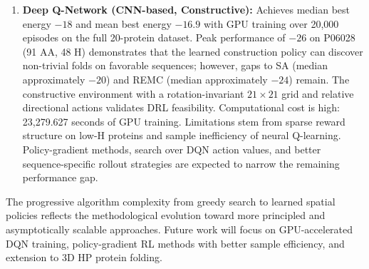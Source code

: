 \begin{enumerate}
    \item \textbf{Deep Q-Network (CNN-based, Constructive):} Achieves median best energy $-18$ and mean best energy $-16.9$ with GPU training over 20,000 episodes on the full 20-protein dataset. Peak performance of $-26$ on P06028 (91 AA, 48 H) demonstrates that the learned construction policy can discover non-trivial folds on favorable sequences; however, gaps to SA (median approximately $-20$) and REMC (median approximately $-24$) remain. The constructive environment with a rotation-invariant $21 \times 21$ grid and relative directional actions validates DRL feasibility. Computational cost is high: 23,279.627 seconds of GPU training. Limitations stem from sparse reward structure on low-H proteins and sample inefficiency of neural Q-learning. Policy-gradient methods, search over DQN action values, and better sequence-specific rollout strategies are expected to narrow the remaining performance gap.
\end{enumerate}

The progressive algorithm complexity from greedy search to learned spatial policies reflects the methodological evolution toward more principled and asymptotically scalable approaches. Future work will focus on GPU-accelerated DQN training, policy-gradient RL methods with better sample efficiency, and extension to 3D HP protein folding.
